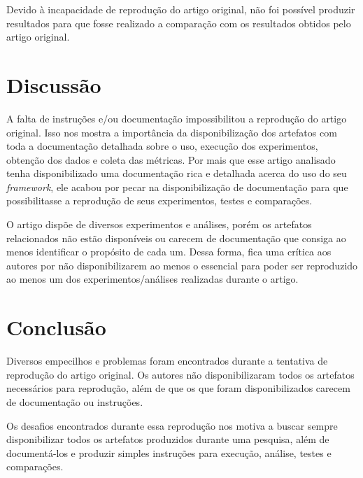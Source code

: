 \documentclass{article}
\begin{document}
Devido à incapacidade de reprodução do artigo original, não foi possível produzir resultados para que fosse realizado a comparação com os resultados obtidos pelo artigo original.

\section{Discussão}

A falta de instruções e/ou documentação impossibilitou a reprodução do artigo original. Isso nos mostra a importância da disponibilização dos artefatos com toda a documentação detalhada sobre o uso, execução dos experimentos, obtenção dos dados e coleta das métricas. Por mais que esse artigo analisado tenha disponibilizado uma documentação rica e detalhada acerca do uso do seu \textit{framework}, ele acabou por pecar na disponibilização de documentação para que possibilitasse a reprodução de seus experimentos, testes e comparações.

O artigo dispõe de diversos experimentos e análises, porém os artefatos relacionados não estão disponíveis ou carecem de documentação que consiga ao menos identificar o propósito de cada um. Dessa forma, fica uma crítica aos autores por não disponibilizarem ao menos o essencial para poder ser reproduzido ao menos um dos experimentos/análises realizadas durante o artigo.

\section{Conclusão}

Diversos empecilhos e problemas foram encontrados durante a tentativa de reprodução do artigo original. Os autores não disponibilizaram todos os artefatos necessários para reprodução, além de que os que foram disponibilizados carecem de documentação ou instruções.

Os desafios encontrados durante essa reprodução nos motiva a buscar sempre disponibilizar todos os artefatos produzidos durante uma pesquisa, além de documentá-los e produzir simples instruções para execução, análise, testes e comparações. 
\end{document}
